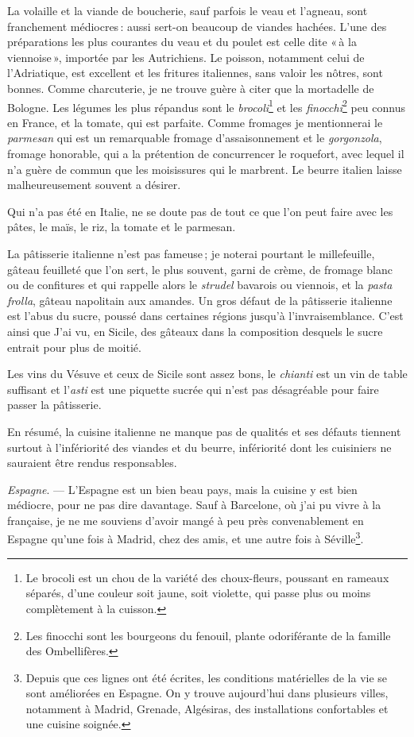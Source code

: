 La volaille et la viande de boucherie, sauf parfois le veau et l'agneau, sont
franchement médiocres : aussi sert-on beaucoup de viandes hachées. L'une des
préparations les plus courantes du veau et du poulet est celle dite « à la
viennoise », importée par les Autrichiens. Le poisson, notamment celui de
l'Adriatique, est excellent et les fritures italiennes, sans valoir les nôtres,
sont bonnes. Comme charcuterie, je ne trouve guère à citer que la mortadelle de
Bologne. Les légumes les plus répandus sont le \textit{brocoli}\footnote{Le
brocoli est un chou de la variété des choux-fleurs, poussant en rameaux
séparés, d'une couleur soit jaune, soit violette, qui passe plus ou moins
complètement à la cuisson.} et les \textit{finocchi}\footnote{Les finocchi sont
les bourgeons du fenouil, plante odoriférante de la famille des Ombellifères.}
peu connus en France, et la tomate, qui est parfaite. Comme fromages je
mentionnerai le \textit{parmesan} qui est un remarquable fromage
d’assaisonnement et le \textit{gorgonzola}, fromage honorable, qui a la
prétention de concurrencer le roquefort, avec lequel il n'a guère de commun que
les moisissures qui le marbrent. Le beurre italien laisse malheureusement
souvent a désirer.

Qui n'a pas été en Italie, ne se doute pas de tout ce que l'on peut faire avec
les pâtes, le maïs, le riz, la tomate et le parmesan.

La pâtisserie italienne n'est pas fameuse ; je noterai pourtant le millefeuille,
gâteau feuilleté que l'on sert, le plus souvent, garni de crème, de fromage
blanc ou de confitures et qui rappelle alors le \textit{strudel} bavarois ou
viennois, et la \textit{pasta frolla}, gâteau napolitain aux amandes. Un gros
défaut de la pâtisserie italienne est l'abus du sucre, poussé dans certaines
régions jusqu'à l'invraisemblance. C'est ainsi que J'ai vu, en Sicile, des
gâteaux dans la composition desquels le sucre entrait pour plus de moitié.

Les vins du Vésuve et ceux de Sicile sont assez bons, le \textit{chianti} est
un vin de table suffisant et l'\textit{asti} est une piquette sucrée qui n'est
pas désagréable pour faire passer la pâtisserie.

En résumé, la cuisine italienne ne manque pas de qualités et ses défauts
tiennent surtout à l'infériorité des viandes et du beurre, infériorité dont les
cuisiniers ne sauraient être rendus responsables.

\sk

\textit{Espagne}. — L'Espagne est un bien beau pays, mais la cuisine y est bien
médiocre, pour ne pas dire davantage. Sauf à Barcelone, où j'ai pu vivre à la
française, je ne me souviens d'avoir mangé à peu près convenablement en Espagne
qu'une fois à Madrid, chez des amis, et une autre fois
à Séville\footnote{Depuis que ces lignes ont été écrites, les conditions
matérielles de la vie se sont améliorées en Espagne. On y trouve aujourd'hui
dans plusieurs villes, notamment à Madrid, Grenade, Algésiras, des
installations confortables et une cuisine soignée.}. 

